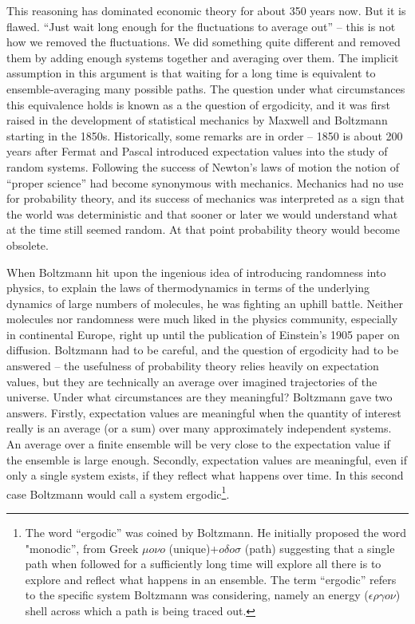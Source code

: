 \documentclass[a4paper]{article}
\begin{document}
This reasoning has dominated economic theory for about 350 years now. But it is flawed. ``Just wait long enough for the 
fluctuations to average out'' -- this is not how we removed the fluctuations. We did something quite different and removed 
them by adding enough systems together and averaging over them. The implicit assumption in this argument is that waiting for a long time is equivalent to ensemble-averaging many possible paths. The question under what circumstances this equivalence holds is known as a the question of ergodicity, and it was first raised in the development of statistical mechanics by Maxwell and Boltzmann starting in the 1850s. Historically, some remarks are in order -- 1850 is about 200 years after Fermat and Pascal introduced expectation values into the study of random systems. Following the success of Newton's laws of motion the notion of ``proper science'' had become synonymous with mechanics. Mechanics had no use for probability theory, and its success of mechanics was interpreted as a sign that the world was deterministic and that sooner or later we would understand what at the time still seemed random. At that point probability theory would become obsolete. 

When Boltzmann hit upon the ingenious idea of introducing randomness into physics, to explain the laws of 
thermodynamics in terms of the underlying dynamics of large numbers of molecules, he was fighting an uphill battle. Neither molecules nor randomness were
much liked in the physics community, especially in continental Europe, right up until the publication of Einstein's 1905 
paper 
on 
diffusion.
Boltzmann had to be careful, and the question of ergodicity had to be answered -- the usefulness of probability theory 
relies 
heavily 
on expectation values, but they are technically an average over imagined trajectories of the universe. Under what 
circumstances are
they meaningful? Boltzmann gave two answers. Firstly, expectation values are meaningful when the quantity of interest 
really 
is 
an
average (or a sum) over many approximately independent systems. An average over a finite ensemble will be 
very close to the expectation value if the ensemble is large enough. Secondly, expectation values are meaningful, even if 
only a 
single
system exists, if they reflect what happens over time. In this second case Boltzmann would call a system 
ergodic\footnote{The word ``ergodic'' was coined by Boltzmann. 
He initially proposed the word "monodic'', from Greek $\mu o \nu o$ (unique)+$o\delta o \sigma$ (path) suggesting 
that a single path when followed for a sufficiently long time will explore all there is to explore and reflect what happens 
in an ensemble. The term ``ergodic'' refers to the specific system Boltzmann was considering, namely an energy 
($\epsilon \rho \gamma o \nu$) shell across which a path is being traced out.}.
\end{document}
